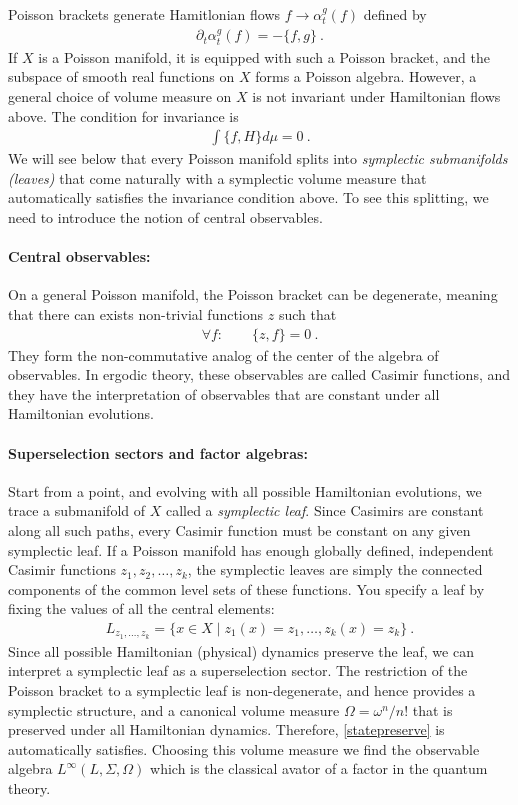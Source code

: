 \documentclass[a4paper,11pt]{article}
\theoremstyle{definition}
\begin{document}
Poisson brackets generate Hamitlonian flows $f\to \alpha^g_t(f)$ defined by 
\begin{align}
    \partial_t\alpha_t^g(f)=-\{f,g\}\ .
\end{align}
If $X$ is a Poisson manifold, it is equipped with such a Poisson bracket, and the subspace of smooth real functions on $X$ forms a Poisson algebra. However, a general choice of volume measure on $X$ is not invariant under Hamiltonian flows above. The condition for invariance is 
\begin{align}\label{statepreserve}
    \int \{f,H\} d\mu=0\ .
\end{align}
We will see below that every Poisson manifold splits into {\it symplectic submanifolds (leaves)} that come naturally with a symplectic volume measure that automatically satisfies the invariance condition above. To see this splitting, we need to introduce the notion of central observables.

\paragraph{Central observables:} On a general Poisson manifold, the Poisson bracket can be degenerate, meaning that there can exists non-trivial functions $z$ such that 
\begin{align}
    \forall f:\qquad \{z,f\}=0\ .
\end{align}
They form the non-commutative analog of the center of the algebra of observables. In ergodic theory, these observables are called Casimir functions, and they have the interpretation of observables that are constant under all Hamiltonian evolutions.

\paragraph{Superselection sectors and factor algebras:} Start from a point, and evolving with all possible Hamiltonian evolutions, we trace a submanifold of $X$ called a {\it symplectic leaf}. Since Casimirs are constant along all such paths, every Casimir function must be constant on any given symplectic leaf.  If a Poisson manifold has enough globally defined, independent Casimir functions $z_1, z_2, \dots, z_k$, the symplectic leaves are simply the connected components of the common level sets of these functions. You specify a leaf by fixing the values of all the central elements:
\begin{align}
    L_{z_1, \dots, z_k} = \{ x \in X \mid z_1(x) = z_1, \dots, z_k(x) = z_k \}\ .
\end{align}
Since all possible Hamiltonian (physical) dynamics preserve the leaf, we can interpret a symplectic leaf as a superselection sector. The restriction of the Poisson bracket to a symplectic leaf is non-degenerate, and hence provides a symplectic structure, and a canonical volume measure $\Omega=\omega^n/n!$ that is preserved under all Hamiltonian dynamics. Therefore, \ref{statepreserve} is automatically satisfies. Choosing this volume measure we find the observable algebra $L^\infty(L,\Sigma,\Omega)$ which is the classical avator of a factor in the quantum theory. 
\end{document}
